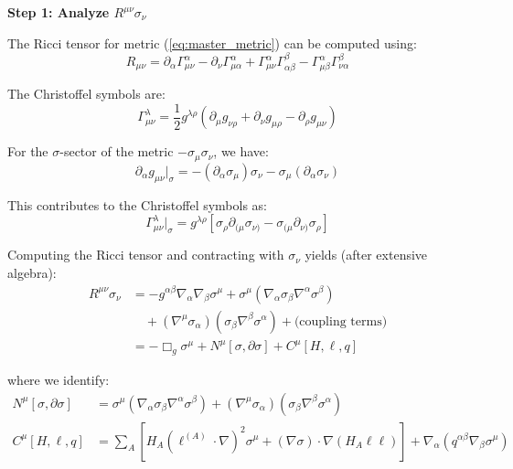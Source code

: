 \documentclass[11pt,a4paper]{article}
\theoremstyle{definition}
\theoremstyle{remark}
\begin{document}
		\textbf{Step 1: Analyze $R^{\mu\nu}\sigma_\nu$}
		
		The Ricci tensor for metric (\ref{eq:master_metric}) can be computed using:
		\begin{equation}
			R_{\mu\nu} = \partial_\alpha\Gamma^\alpha_{\mu\nu} - \partial_\nu\Gamma^\alpha_{\mu\alpha} + \Gamma^\alpha_{\mu\nu}\Gamma^\beta_{\alpha\beta} - \Gamma^\alpha_{\mu\beta}\Gamma^\beta_{\nu\alpha}
		\end{equation}
		
		The Christoffel symbols are:
		\begin{equation}
			\Gamma^\lambda_{\mu\nu} = \frac{1}{2}g^{\lambda\rho}(\partial_\mu g_{\nu\rho} + \partial_\nu g_{\mu\rho} - \partial_\rho g_{\mu\nu})
		\end{equation}
		
		For the $\sigma$-sector of the metric $-\sigma_\mu\sigma_\nu$, we have:
		\begin{equation}
			\partial_\alpha g_{\mu\nu}\big|_\sigma = -(\partial_\alpha\sigma_\mu)\sigma_\nu - \sigma_\mu(\partial_\alpha\sigma_\nu)
		\end{equation}
		
		This contributes to the Christoffel symbols as:
		\begin{equation}
			\Gamma^\lambda_{\mu\nu}\big|_\sigma = g^{\lambda\rho}[\sigma_\rho\partial_{(\mu}\sigma_{\nu)} - \sigma_{(\mu}\partial_{\nu)}\sigma_\rho]
		\end{equation}
		
		Computing the Ricci tensor and contracting with $\sigma_\nu$ yields (after extensive algebra):
		\begin{align}
			R^{\mu\nu}\sigma_\nu &= -g^{\alpha\beta}\nabla_\alpha\nabla_\beta\sigma^\mu + \sigma^\mu(\nabla_\alpha\sigma_\beta\nabla^\alpha\sigma^\beta)\\
			&\quad + (\nabla^\mu\sigma_\alpha)(\sigma_\beta\nabla^\beta\sigma^\alpha) + \text{(coupling terms)}\\
			&= -\Box_g\sigma^\mu + N^\mu[\sigma,\partial\sigma] + C^\mu[H,\ell,q]
		\end{align}
		
		where we identify:
		\begin{align}
			N^\mu[\sigma,\partial\sigma] &= \sigma^\mu(\nabla_\alpha\sigma_\beta\nabla^\alpha\sigma^\beta) + (\nabla^\mu\sigma_\alpha)(\sigma_\beta\nabla^\beta\sigma^\alpha)\\
			C^\mu[H,\ell,q] &= \sum_A\left[H_A(\ell^{(A)}\cdot\nabla)^2\sigma^\mu + (\nabla\sigma)\cdot\nabla(H_A\ell\ell)\right] + \nabla_\alpha(q^{\alpha\beta}\nabla_\beta\sigma^\mu)
		\end{align}
		
\end{document}
